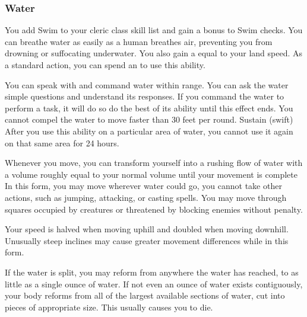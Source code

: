        \subsubsection{Water}
             You add Swim to your cleric class skill list and gain a  bonus to Swim checks.
             You can breathe water as easily as a human breathes air, preventing you from drowning or suffocating underwater.
            You also gain a  equal to your land speed.
             As a standard action, you can spend an  to use this ability.
            \begin{ability}
                \begin{spelltargetinginfo}
                    \spellrng{\rnglong}
                \end{spelltargetinginfo}
                \begin{spelleffects}
                    \spelleffect You can speak with and command water within range.
                    You can ask the water simple questions and understand its responses.
                    If you command the water to perform a task, it will do so do the best of its ability until this effect ends.
                    You cannot compel the water to move faster than 30 feet per round.
                    \spelldur Sustain (swift)
                    \spellspecial After you use this ability on a particular area of water, you cannot use it again on that same area for 24 hours.
                \end{spelleffects}
            \end{ability}
            Whenever you move, you can transform yourself into a rushing flow of water with a volume roughly equal to your normal volume until your movement is complete
            In this form, you may move wherever water could go, you cannot take other actions, such as jumping, attacking, or casting spells.
            You may move through squares occupied by creatures or threatened by blocking enemies without penalty.
            \par Your speed is halved when moving uphill and doubled when moving downhill.
            Unusually steep inclines may cause greater movement differences while in this form.
            \par If the water is split, you may reform from anywhere the water has reached, to as little as a single ounce of water.
            If not even an ounce of water exists contiguously, your body reforms from all of the largest available sections of water, cut into pieces of appropriate size.
            This usually causes you to die.

